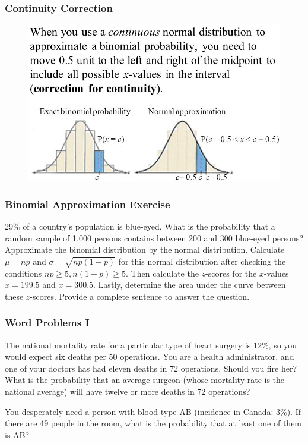 \documentclass[xcolor=dvipsnames]{beamer}
\begin{document}
\begin{frame}
  \frametitle{Continuity Correction}
  \begin{figure}[h]
    \includegraphics[scale=.5]{./diagrams/contcorr_ed1.jpg}
  \end{figure}
\end{frame}

\begin{frame}
  \frametitle{Binomial Approximation Exercise}
{\ubung} 29\% of a country's population is blue-eyed. What is the
probability that a random sample of 1,000 persons contains between 200
and 300 blue-eyed persons? Approximate the binomial distribution by
the normal distribution. Calculate $\mu=np$ and
$\sigma=\sqrt{np(1-p)}$ for this normal distribution after checking
the conditions $np\geq{}5,n(1-p)\geq{}5$. Then calculate the
$z$-scores for the $x$-values $x=199.5$ and $x=300.5$. Lastly,
determine the area under the curve between these $z$-scores. Provide a
complete sentence to answer the question.
\end{frame}

\begin{frame}
  \frametitle{Word Problems I}
  The national mortality rate for a particular type of heart surgery
  is 12\%, so you would expect six deaths per 50 operations. You are a
  health administrator, and one of your doctors has had eleven deaths
  in 72 operations. Should you fire her? What is the probability that
  an average surgeon (whose mortality rate is the national average)
  will have twelve or more deaths in 72 operations?

  \bigskip

  You desperately need a person with blood type AB (incidence in
  Canada: 3\%). If there are 49 people in the room, what is the
  probability that at least one of them is AB?
\end{frame}
\end{document}
